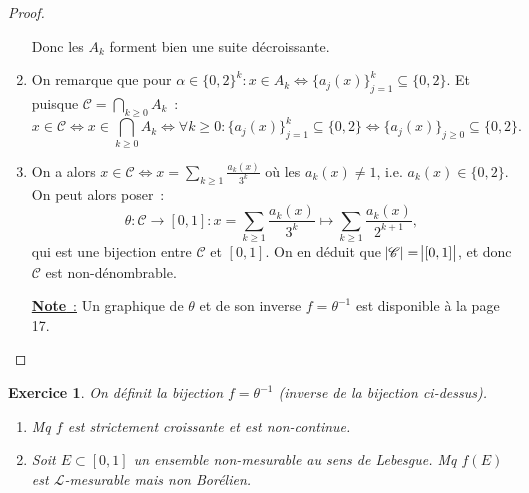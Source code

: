 \documentclass{article}
\newtheorem{ex}{Exercice}[section]
\begin{document}
\begin{proof}
\begin{enumerate}
	Donc les $A_k$ forment bien une suite décroissante.

	\item On remarque que pour $\alpha \in \{0, 2\}^k : x \in A_k \iff \{a_j(x)\}_{j=1}^k \subseteq \{0, 2\}$. Et puisque $\mathscr C = \bigcap_{k \geq 0}A_k$~:
	\[x \in \mathscr C \iff x \in \bigcap_{k \geq 0}A_k \iff \forall k \geq 0 : \{a_j(x)\}_{j=1}^k \subseteq \{0, 2\} \iff \{a_j(x)\}_{j \geq 0} \subseteq \{0, 2\}.\]

	\item On a alors $x \in \mathscr C \iff x = \sum_{k \geq 1}\frac {a_k(x)}{3^k}$ où les $a_k(x) \neq 1$, i.e. $a_k(x) \in \{0, 2\}$. On peut alors poser~:
	\[\theta : \mathscr C \to [0, 1] : x = \sum_{k \geq 1}\frac {a_k(x)}{3^k} \mapsto \sum_{k \geq 1}\frac {a_k(x)}{2^{k+1}},\]
	qui est une bijection entre $\mathscr C$ et $[0, 1]$. On en déduit que $\abs {\mathscr C} = \abs {[0, 1]}$, et donc $\mathscr C$ est non-dénombrable.

	\underline {\textbf{Note}~:} Un graphique de $\theta$ et de son inverse $f = \theta^{-1}$ est disponible à la page 17.
\end{enumerate}
\end{proof}

\begin{ex} On définit la bijection $f = \theta^{-1}$ (inverse de la bijection ci-dessus).
\begin{enumerate}
	\item Mq $f$ est strictement croissante et est non-continue.
	\item Soit $E \subset [0, 1]$ un ensemble non-mesurable au sens de Lebesgue. Mq $f(E)$ est $\mathcal L$-mesurable mais non Borélien.
\end{enumerate}
\end{ex}
\end{document}
